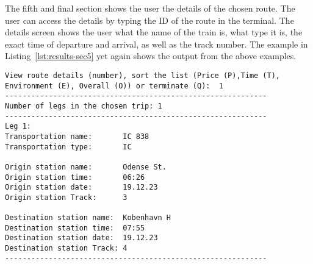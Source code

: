 The fifth and final section shows the user the details of the chosen route.
The user can access the details by typing the ID of the route in the terminal.
The details screen shows the user what the name of the train is, what type it is, the exact time of departure and
arrival, as well as the track number.
The example in Listing~\ref{lst:results-sec5} yet again shows the output from the above examples.

\begin{lstlisting}[label={lst:results-sec5}, caption={Route details output.}, captionpos=b, language={}]
View route details (number), sort the list (Price (P),Time (T), Environment (E), Overall (O)) or terminate (Q):  1
------------------------------------------------------------
Number of legs in the chosen trip: 1
------------------------------------------------------------
Leg 1:
Transportation name:       IC 838
Transportation type:       IC

Origin station name:       Odense St.
Origin station time:       06:26
Origin station date:       19.12.23
Origin station Track:      3

Destination station name:  Kobenhavn H
Destination station time:  07:55
Destination station date:  19.12.23
Destination station Track: 4
------------------------------------------------------------
\end{lstlisting}

